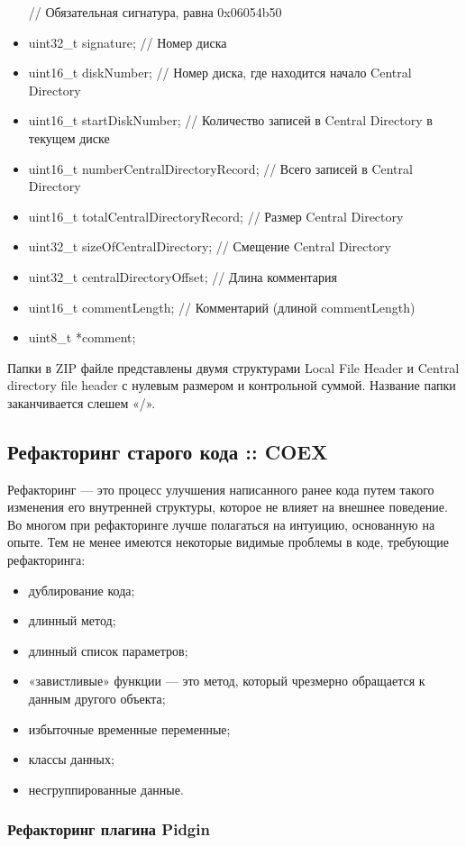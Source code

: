\begin{itemize}
// Обязательная сигнатура, равна 0x06054b50
\item uint32_t signature; // Номер диска
\item uint16_t diskNumber;   // Номер диска, где находится начало Central Directory
\item uint16_t startDiskNumber;    // Количество записей в Central Directory в текущем диске
\item uint16_t numberCentralDirectoryRecord;    // Всего записей в Central Directory
\item uint16_t totalCentralDirectoryRecord;    // Размер Central Directory
\item uint32_t sizeOfCentralDirectory;    // Смещение Central Directory
\item uint32_t centralDirectoryOffset;    // Длина комментария
\item uint16_t commentLength;    // Комментарий (длиной commentLength)
\item uint8_t *comment;
\end{itemize}

Папки в ZIP файле представлены двумя структурами Local File Header и Central directory file header с нулевым размером и контрольной суммой. Название папки заканчивается слешем «/».

\subsection{Рефакторинг старого кода :: COEX}
Рефакторинг — это процесс улучшения написанного ранее кода путем такого изменения его внутренней структуры, которое не влияет на внешнее поведение.
Во многом при рефакторинге лучше полагаться на интуицию, основанную на опыте. Тем не менее имеются некоторые видимые проблемы в коде, требующие рефакторинга:
\begin{itemize}
\item дублирование кода;
\item длинный метод;
\item длинный список параметров;
\item «завистливые» функции — это метод, который чрезмерно обращается к данным другого объекта;
\item избыточные временные переменные;
\item классы данных;
\item несгруппированные данные.
\end{itemize}

\subsubsection{Рефакторинг плагина Pidgin}


